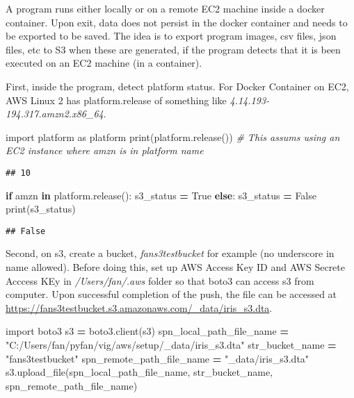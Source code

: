 \documentclass[
]{book}
\newenvironment{Shaded}{\begin{snugshade}}{\end{snugshade}}
\newcommand{\BuiltInTok}[1]{#1}
\newcommand{\CommentTok}[1]{\textcolor[rgb]{0.56,0.35,0.01}{\textit{#1}}}
\newcommand{\ControlFlowTok}[1]{\textcolor[rgb]{0.13,0.29,0.53}{\textbf{#1}}}
\newcommand{\ImportTok}[1]{#1}
\newcommand{\KeywordTok}[1]{\textcolor[rgb]{0.13,0.29,0.53}{\textbf{#1}}}
\newcommand{\NormalTok}[1]{#1}
\newcommand{\OperatorTok}[1]{\textcolor[rgb]{0.81,0.36,0.00}{\textbf{#1}}}
\newcommand{\StringTok}[1]{\textcolor[rgb]{0.31,0.60,0.02}{#1}}
\newcommand{\VariableTok}[1]{\textcolor[rgb]{0.00,0.00,0.00}{#1}}
\begin{document}
A program runs either locally or on a remote EC2 machine inside a docker container. Upon exit, data does not persist in the docker container and needs to be exported to be saved. The idea is to export program images, csv files, json files, etc to S3 when these are generated, if the program detects that it is been executed on an EC2 machine (in a container).

First, inside the program, detect platform status. For Docker Container on EC2, AWS Linux 2 has platform.release of something like \emph{4.14.193-194.317.amzn2.x86\_64}.

\begin{Shaded}
\begin{Highlighting}[]
\ImportTok{import}\NormalTok{ platform }\ImportTok{as}\NormalTok{ platform}
\BuiltInTok{print}\NormalTok{(platform.release())}
\CommentTok{\# This assums using an EC2 instance where amzn is in platform name}
\end{Highlighting}
\end{Shaded}

\begin{verbatim}
## 10
\end{verbatim}

\begin{Shaded}
\begin{Highlighting}[]
\ControlFlowTok{if} \StringTok{\textquotesingle{}amzn\textquotesingle{}} \KeywordTok{in}\NormalTok{ platform.release():}
\NormalTok{    s3\_status }\OperatorTok{=} \VariableTok{True}
\ControlFlowTok{else}\NormalTok{:}
\NormalTok{    s3\_status }\OperatorTok{=} \VariableTok{False}
\BuiltInTok{print}\NormalTok{(s3\_status)}
\end{Highlighting}
\end{Shaded}

\begin{verbatim}
## False
\end{verbatim}

Second, on s3, create a bucket, \emph{fans3testbucket} for example (no underscore in name allowed). Before doing this, set up AWS Access Key ID and AWS Secrete Acccess KEy in \emph{/Users/fan/.aws} folder so that boto3 can access s3 from computer. Upon successful completion of the push, the file can be accessed at \url{https://fans3testbucket.s3.amazonaws.com/_data/iris_s3.dta}.

\begin{Shaded}
\begin{Highlighting}[]
\ImportTok{import}\NormalTok{ boto3}
\NormalTok{s3 }\OperatorTok{=}\NormalTok{ boto3.client(}\StringTok{\textquotesingle{}s3\textquotesingle{}}\NormalTok{)}
\NormalTok{spn\_local\_path\_file\_name }\OperatorTok{=} \StringTok{"C:/Users/fan/pyfan/vig/aws/setup/\_data/iris\_s3.dta"}
\NormalTok{str\_bucket\_name }\OperatorTok{=} \StringTok{"fans3testbucket"}
\NormalTok{spn\_remote\_path\_file\_name }\OperatorTok{=} \StringTok{"\_data/iris\_s3.dta"}
\NormalTok{s3.upload\_file(spn\_local\_path\_file\_name, str\_bucket\_name, spn\_remote\_path\_file\_name)}
\end{Highlighting}
\end{Shaded}
\end{document}
